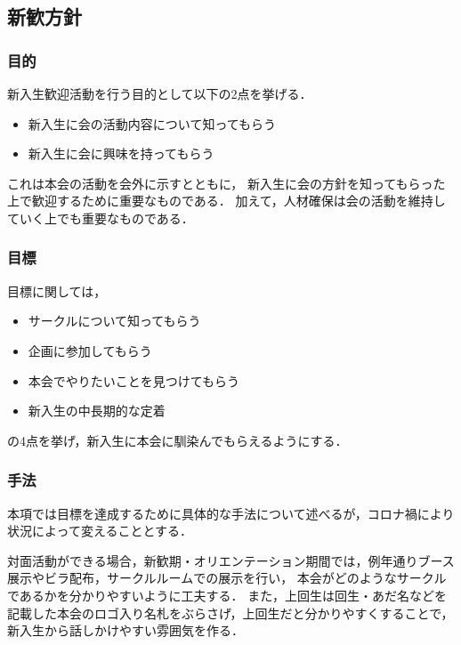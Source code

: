 \subsection*{新歓方針}


\subsubsection*{目的}
新入生歓迎活動を行う目的として以下の2点を挙げる．
\begin{itemize}
\item 新入生に会の活動内容について知ってもらう
\item 新入生に会に興味を持ってもらう
\end{itemize}
これは本会の活動を会外に示すとともに，
新入生に会の方針を知ってもらった上で歓迎するために重要なものである．
加えて，人材確保は会の活動を維持していく上でも重要なものである．

\subsubsection*{目標}
目標に関しては，
\begin{itemize}
\item サークルについて知ってもらう
\item 企画に参加してもらう
\item 本会でやりたいことを見つけてもらう
\item 新入生の中長期的な定着
\end{itemize}
の4点を挙げ，新入生に本会に馴染んでもらえるようにする．

\subsubsection*{手法}
本項では目標を達成するために具体的な手法について述べるが，コロナ禍により状況によって変えることとする．

対面活動ができる場合，新歓期・オリエンテーション期間では，例年通りブース展示やビラ配布，サークルルームでの展示を行い，
本会がどのようなサークルであるかを分かりやすいように工夫する．
また，上回生は回生・あだ名などを記載した本会のロゴ入り名札をぶらさげ，上回生だと分かりやすくすることで，
新入生から話しかけやすい雰囲気を作る．

